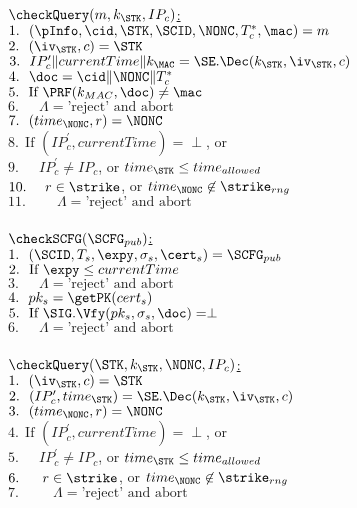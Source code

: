 \\
\underline{$\checkQuery(m, k_{\STK}, IP_c)$:} \\
 $1.\ \ (\pInfo, \cid, \STK, \SCID, \NONC, T_c^{\ast}, \mac) = m$ \\
 $2.\ \ (\iv_{\STK}, c) = \STK$ \\
 $3.\ \ IP_c^{\prime} \| currentTime \| k_{\MAC} = \SE.\Dec(k_{\STK}, \iv_{\STK}, c)$ \\
 $4.\ \ \doc = \cid \| \NONC \| T_c^{\ast}$ \\
 $5.\ \ \text{If } \PRF(k_{MAC}, \doc) \neq \mac$ \\
 $6.\ \ \quad \Lambda = \text{'reject' and abort}$ \\
 $7.\ \ (time_{\NONC}, r) = \NONC$ \\
 $8.\ \ \text{If } (IP_c^{\prime}, currentTime) = \perp$, or \\
 $9.\ \ \quad IP_c^{\prime} \neq IP_c$, or $time_{\STK} \leq time_{allowed}$\\
 $10.\  \quad r \in \strike$, or $time_{\NONC} \not\in \strike_{rng}$ \\
 $11.\  \quad \quad \Lambda = \text{'reject' and abort}$ \\
\\
\underline{$\checkSCFG(\SCFG_{pub})$:} \\
 $1.\ \ (\SCID, T_s, \expy, \sigma_s, \cert_s) = \SCFG_{pub}$ \\
 $2.\ \ \text{If } \expy \leq currentTime$ \\
 $3.\ \ \quad \Lambda = \text{'reject' and abort}$ \\
 $4.\ \ pk_s = \getPK(cert_s)$ \\
 $5.\ \ \text{If } \SIG.\Vfy(pk_s, \sigma_s, \doc) = \perp$ \\
 $6.\ \ \quad \Lambda = \text{'reject' and abort}$ \\
\\
\underline{$\checkQuery(\STK, k_{\STK}, \NONC, IP_c)$:} \\
 $1.\ \ (\iv_{\STK}, c) = \STK$ \\
 $2.\ \ (IP_c^{\prime}, time_{\STK}) = \SE.\Dec(k_{\STK}, \iv_{\STK}, c)$ \\
 $3.\ \ (time_{\NONC}, r) = \NONC$ \\
 $4.\ \ \text{If } (IP_c^{\prime}, currentTime) = \perp$, or \\
 $5.\ \ \quad IP_c^{\prime} \neq IP_c$, or $time_{\STK} \leq time_{allowed}$\\
 $6.\ \ \quad r \in \strike$, or $time_{\NONC} \not\in \strike_{rng}$ \\
 $7.\ \ \quad \quad \Lambda = \text{'reject' and abort}$ \\